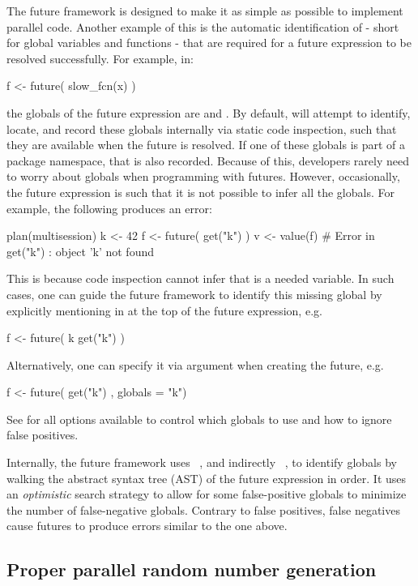 The future framework is designed to make it as simple as possible to
implement parallel code.  Another example of this is the automatic
identification of  - short for global variables and functions
- that are required for a future expression to be resolved
successfully.  For example, in:
\begin{example}
f <- future({
  slow_fcn(x)
})
\end{example}
the globals of the future expression are 
and .  By default,  will attempt to identify,
locate, and record these globals internally via static code
inspection, such that they are available when the future is resolved.
If one of these globals is part of a package namespace, that is also
recorded.  Because of this, developers rarely need to worry about
globals when programming with futures.
%
However, occasionally, the future expression is such that it is not
possible to infer all the globals.  For example, the following
produces an error:
\begin{example}
plan(multisession)
k <- 42
f <- future({
  get("k")
})
v <- value(f)
# Error in get("k") : object 'k' not found
\end{example}
This is because code inspection cannot infer that  is a needed
variable.  In such cases, one can guide the future framework to
identify this missing global by explicitly mentioning in at the top of
the future expression, e.g.
\begin{example}
f <- future({
  k
  get("k")
})
\end{example}
Alternatively, one can specify it via argument  when
creating the future, e.g.
\begin{example}
f <- future({
  get("k")
}, globals = "k")
\end{example}
See  for all options
available to control which globals to use and how to ignore false
positives.

Internally, the future framework
uses ~\citep{CRAN:globals}, and
indirectly ~\citep{CRAN:codetools}, to identify
globals by walking the abstract syntax tree (AST) of the future
expression in order.  It uses an \emph{optimistic} search strategy to
allow for some false-positive globals to minimize the number of
false-negative globals.  Contrary to false positives, false negatives
cause futures to produce errors similar to the one above.


\subsection{Proper parallel random number generation}
\label{proper-parallel-random-number-generation-rng}

